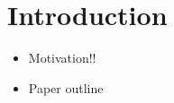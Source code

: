 \section{Introduction}\label{sect:intro}

\begin{itemize}
	\item Motivation!!
	\item Paper outline
\end{itemize}
